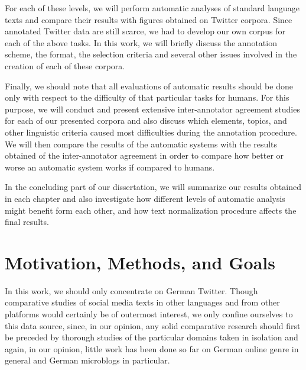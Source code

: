 For each of these levels, we will perform automatic analyses of standard
language texts and compare their results with figures obtained on Twitter
corpora.  Since annotated Twitter data are still scarce, we had to develop our
own corpus for each of the above tasks.  In this work, we will briefly discuss
the annotation scheme, the format, the selection criteria and several other
issues involved in the creation of each of these corpora.

Finally, we should note that all evaluations of automatic results should be
done only with respect to the difficulty of that particular tasks for humans.
For this purpose, we will conduct and present extensive inter-annotator
agreement studies for each of our presented corpora and also discuss which
elements, topics, and other linguistic criteria caused most difficulties
during the annotation procedure.  We will then compare the results of the
automatic systems with the results obtained of the inter-annotator agreement
in order to compare how better or worse an automatic system works if compared
to humans.

In the concluding part of our dissertation, we will summarize our results
obtained in each chapter and also investigate how different levels of
automatic analysis might benefit form each other, and how text normalization
procedure affects the final results.

\section*{Motivation, Methods, and Goals}

In this work, we should only concentrate on German Twitter.  Though
comparative studies of social media texts in other languages and from other
platforms would certainly be of outermost interest, we only confine ourselves
to this data source, since, in our opinion, any solid comparative research
should first be preceded by thorough studies of the particular domains taken
in isolation and again, in our opinion, little work has been done so far on
German online genre in general and German microblogs in particular.

